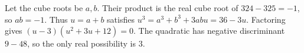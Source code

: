 Let the cube roots be $a,b$. Their product is the real cube root of $324-325=-1$, so $ab=-1$. Thus $u=a+b$ satisfies $u^3=a^3+b^3+3abu=36-3u$. Factoring gives $(u-3)(u^2+3u+12)=0$. The quadratic has negative discriminant $9-48$, so the only real possibility is $\boxed3$.
